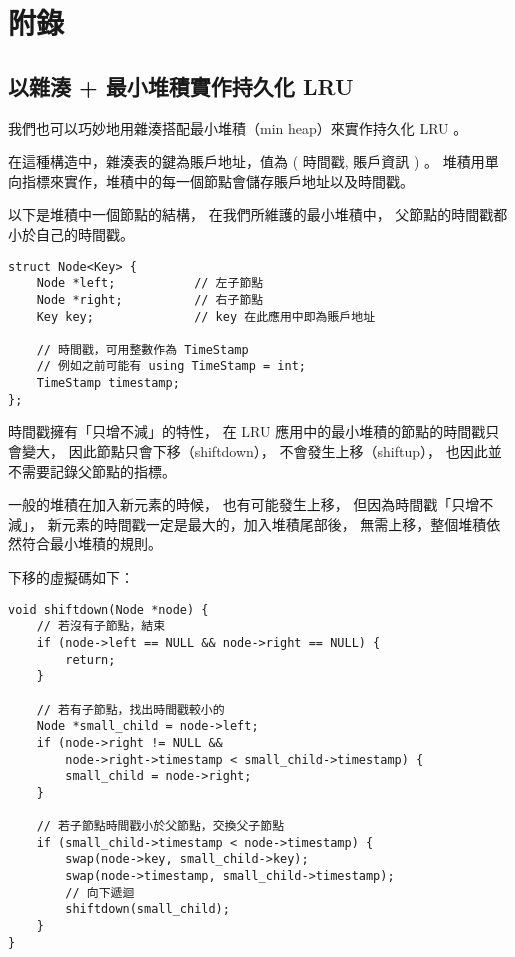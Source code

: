 \chapter{附錄}

\section{以雜湊 + 最小堆積實作持久化 LRU}

我們也可以巧妙地用雜湊搭配最小堆積（min heap）來實作持久化 LRU 。

在這種構造中，雜湊表的鍵為賬戶地址，值為 ( 時間戳, 賬戶資訊 ) 。
堆積用單向指標來實作，堆積中的每一個節點會儲存賬戶地址以及時間戳。

以下是堆積中一個節點的結構，
在我們所維護的最小堆積中，
父節點的時間戳都小於自己的時間戳。

\begin{lstlisting}
struct Node<Key> {
    Node *left;           // 左子節點
    Node *right;          // 右子節點
    Key key;              // key 在此應用中即為賬戶地址

    // 時間戳，可用整數作為 TimeStamp
    // 例如之前可能有 using TimeStamp = int;
    TimeStamp timestamp;
};
\end{lstlisting}

時間戳擁有「只增不減」的特性，
在 LRU 應用中的最小堆積的節點的時間戳只會變大，
因此節點只會下移（shiftdown），
不會發生上移（shiftup），
也因此並不需要記錄父節點的指標。

一般的堆積在加入新元素的時候，
也有可能發生上移，
但因為時間戳「只增不減」，
新元素的時間戳一定是最大的，加入堆積尾部後，
無需上移，整個堆積依然符合最小堆積的規則。

下移的虛擬碼如下：

\begin{lstlisting}
void shiftdown(Node *node) {
    // 若沒有子節點，結束
    if (node->left == NULL && node->right == NULL) {
        return;
    }

    // 若有子節點，找出時間戳較小的
    Node *small_child = node->left;
    if (node->right != NULL &&
        node->right->timestamp < small_child->timestamp) {
        small_child = node->right;
    }

    // 若子節點時間戳小於父節點，交換父子節點
    if (small_child->timestamp < node->timestamp) {
        swap(node->key, small_child->key);
        swap(node->timestamp, small_child->timestamp);
        // 向下遞迴
        shiftdown(small_child);
    }
}
\end{lstlisting}

